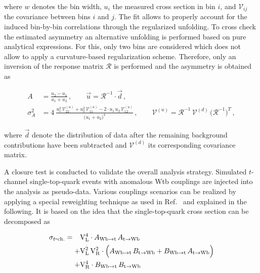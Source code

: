 where $w$ denotes the bin width, $u_{i}$ the measured cross section in bin $i$, and $\mathcal{V}_{ij}$ the covariance between bins $i$ and $j$. The fit allows to properly account for the induced bin-by-bin correlations through the regularized unfolding. To cross check the estimated asymmetry an alternative unfolding is performed based on pure analytical expressions. For this, only two bins are considered which does not allow to apply a curvature-based regularization scheme. Therefore, only an inversion of the response matrix $\mathcal{R}$ is performed and the asymmetry is obtained as

\begin{subequations}
\begin{align}
A&=\frac{u_2-u_1}{u_1+u_2}\,,\qquad \vec{u}=\mathcal{R}^{-1}\cdot\vec{d}\,,\\
\sigma^2_{A}&=4~\frac{u_1^2\,\mathcal{V}^{(u)}_{22}+u_2^2\,\mathcal{V}^{(u)}_{11}-2 \cdot u_1\,u_{2}\,\mathcal{V}^{(u)}_{12}}{\big(u_1+u_2\big)^4}\,, \qquad\mathcal{V}^{(u)}=\mathcal{R}^{-1}\,\mathcal{V}^{(d)}\,\big(\mathcal{R}^{-1}\big)^{T}\,,
\end{align}
\end{subequations}

where $\vec{d}$ denote the distribution of data after the remaining background contributions have been subtracted and $\mathcal{V}^{(d)}$ its corresponding covariance matrix.

A closure test is conducted to validate the overall analysis strategy. Simulated $t$-channel single-top-quark events with anomalous Wtb couplings are injected into the analysis as pseudo-data. Various couplings scenarios can be realized by applying a special reweighting technique as used in Ref.~\cite{Khachatryan:2016sib} and explained in the following. It is based on the idea that the single-top-quark cross section can be decomposed as

\begin{subequations}
\begin{align}
\sigma_{t\mathrm{\mbox{-}ch.}}=\hphantom{+}&\mathrm{V}_\mathrm{L}^4\cdot A_{\mathrm{Wb}\to\mathrm{t}}\,A_{\mathrm{t}\to\mathrm{Wb}}\label{eq:polarization-wtb-rew-vl}\\+&\mathrm{V}_\mathrm{L}^2\,\mathrm{V}_\mathrm{R}^2\cdot \Big(A_{\mathrm{Wb}\to\mathrm{t}}\,B_{\mathrm{t}\to\mathrm{Wb}}+B_{\mathrm{Wb}\to\mathrm{t}}\,A_{\mathrm{t}\to\mathrm{Wb}}\Big)\label{eq:polarization-wtb-rew-vlvr}\\+&\mathrm{V}_\mathrm{R}^4\cdot B_{\mathrm{Wb}\to\mathrm{t}}\,B_{\mathrm{t}\to\mathrm{Wb}}\label{eq:polarization-wtb-rew-vr}
\end{align}
\end{subequations}

